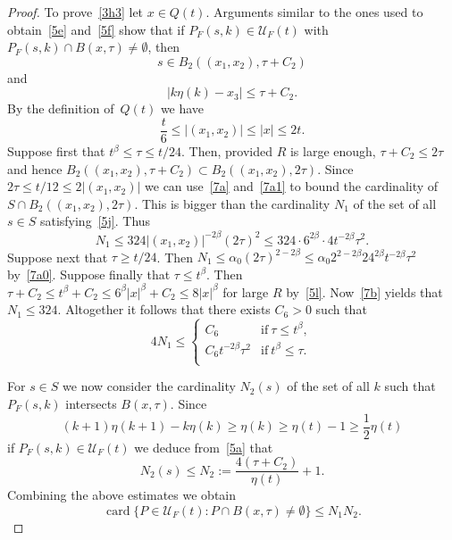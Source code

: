 \documentclass[10pt,a4paper]{amsart}
\def\cU{\mathcal U}
\def\card{\operatorname{card}}
\begin{document}
\begin{proof}
To prove~\eqref{3h3} let $x\in Q(t)$. Arguments similar to the ones used
to obtain~\eqref{5e} and~\eqref{5f} show that if $P_F(s,k)\in \cU_F(t)$ with 
$P_F(s,k)\cap B(x,\tau)\neq\emptyset$, then
\begin{equation}\label{5j}
s\in 
B_2((x_1,x_2), \tau+C_2)
\end{equation}
and 
\begin{equation}\label{5k}
|k\eta(k)-x_3|\leq \tau+C_2.
\end{equation}
By the definition of~$Q(t)$ we have
\begin{equation}\label{5l}
\frac{t}{6}\leq |(x_1,x_2)|\leq |x| \leq 2t .
\end{equation}
Suppose first that $t^\beta\leq\tau\leq t/24$. 
Then, provided $R$ is large enough,  $\tau+C_2\leq 2\tau$ and hence
$B_2((x_1,x_2), \tau+C_2)\subset B_2((x_1,x_2), 2\tau)$.
Since $2\tau\leq t/12\leq 2|(x_1,x_2)|$ we can use~\eqref{7a} and~\eqref{7a1}
to bound the cardinality of $S\cap B_2((x_1,x_2),2\tau)$.
This is bigger than 
the cardinality $N_1$ of the set of all $s\in S$ satisfying~\eqref{5j}. Thus
\begin{equation}\label{5m}
N_1\leq 324 |(x_1,x_2)|^{-2\beta} (2\tau)^2
\leq 324\cdot 6^{2\beta}\cdot  4 t^{-2\beta}\tau^2 .
\end{equation}
Suppose next that $\tau\geq t/24$. Then 
$N_1\leq \alpha_0 (2\tau)^{2-2\beta}\leq
\alpha_0 2^{2-2\beta} 24^{2\beta} t^{-2\beta}\tau^2$ by~\eqref{7a0}.
Suppose finally that $\tau\leq t^\beta$.
Then $\tau+C_2\leq t^\beta+C_2\leq 6^\beta|x|^\beta+C_2\leq 8|x|^\beta$ for large $R$
by~\eqref{5l}. Now~\eqref{7b} yields that $N_1\leq 324$. 
Altogether it follows that there exists $C_6>0$ such that 
\begin{equation}\label{5n2}
4 N_1\leq 
\begin{cases}
 C_6 &\text{if}\ \tau\leq t^{\beta},\\
\displaystyle C_6 t^{-2\beta}\tau^2   &\text{if}\ t^{\beta}\leq\tau .\\
\end{cases}
\end{equation}

For $s\in S$ we now consider the cardinality $N_2(s)$ of the set of all 
$k$ such that $P_F(s,k)$ intersects $B(x,\tau)$.
Since 
\begin{equation}\label{5m1}
(k+1)\eta(k+1)-k\eta(k)\geq \eta(k)\geq \eta(t)-1\geq \frac12 \eta(t)
\end{equation}
if $P_F(s,k)\in \cU_F(t)$ we deduce from~\eqref{5a} that
\begin{equation}\label{5n}
N_2(s)\leq N_2:=\frac{4(\tau+C_2)}{\eta(t)}  +1. 
\end{equation}
Combining the above estimates we obtain 
\begin{equation}\label{5n1}
\card\{P\in  \cU_F(t)\colon P\cap B(x,\tau)\neq\emptyset\}
\leq N_1 N_2.
\end{equation}


\end{proof}
\end{document}
